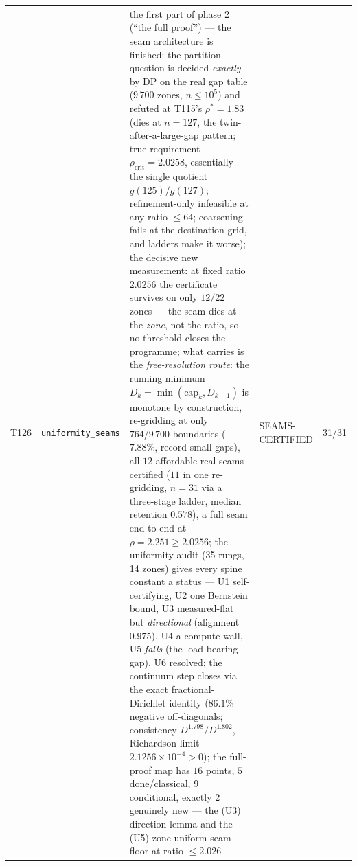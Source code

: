 \documentclass[11pt,a4paper]{article}
\begin{document}
{\begin{xltabular}{\linewidth}{@{}p{0.95cm} >{\raggedright\arraybackslash}p{3.1cm} Y >{\raggedright\scriptsize\arraybackslash}p{3.35cm} p{1.15cm}@{}}
T126 & \texttt{\scriptsize uniformity\_\allowbreak seams} & the first part of phase 2 (``the full proof'') --- the seam architecture is finished: the partition question is decided \emph{exactly} by DP on the real gap table ($9\,700$ zones, $n\le10^{5}$) and refuted at T115's $\rho^*=1.83$ (dies at $n=127$, the twin-after-a-large-gap pattern; true requirement $\rho_{\mathrm{crit}}=2.0258$, essentially the single quotient $g(125)/g(127)$; refinement-only infeasible at any ratio $\le64$; coarsening fails at the destination grid, and ladders make it worse); the decisive new measurement: at fixed ratio $2.0256$ the certificate survives on only $12/22$ zones --- the seam dies at the \emph{zone}, not the ratio, so no threshold closes the programme; what carries is the \emph{free-resolution route}: the running minimum $D_k=\min(\mathrm{cap}_k,D_{k-1})$ is monotone by construction, re-gridding at only $764/9\,700$ boundaries ($7.88\%$, record-small gaps), all $12$ affordable real seams certified ($11$ in one re-gridding, $n=31$ via a three-stage ladder, median retention $0.578$), a full seam end to end at $\rho=2.251\ge2.0256$; the uniformity audit (35 rungs, 14 zones) gives every spine constant a status --- U1 self-certifying, U2 one Bernstein bound, U3 measured-flat but \emph{directional} (alignment $0.975$), U4 a compute wall, U5 \emph{falls} (the load-bearing gap), U6 resolved; the continuum step closes via the exact fractional-Dirichlet identity ($86.1\%$ negative off-diagonals; consistency $D^{1.798}/D^{1.802}$, Richardson limit $2.1256\times10^{-4}>0$); the full-proof map has $16$ points, $5$ done/classical, $9$ conditional, exactly $2$ genuinely new --- the (U3) direction lemma and the (U5) zone-uniform seam floor at ratio $\le2.026$ & SEAMS-CERTIFIED & 31/31\\

\end{xltabular}}
\end{document}
